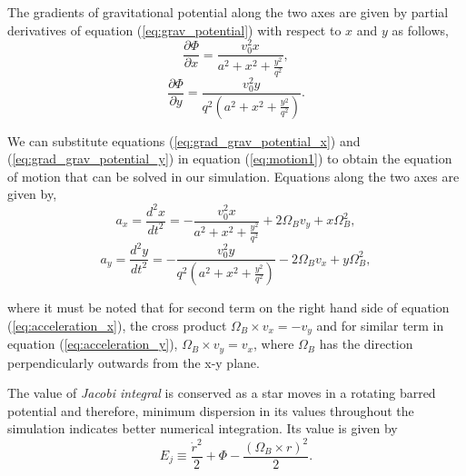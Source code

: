 \documentclass[a4paper]{article}
\begin{document}
	The gradients of gravitational potential along the two axes are given by partial derivatives of equation (\ref{eq:grav_potential}) with respect to \(x\) and \(y\) as follows,
	\begin{equation}
		\frac{\partial \Phi}{\partial x} = \frac{v_0^2 x}{a^2+x^2+\frac{y^2}{q^2}},
		\label{eq:grad_grav_potential_x}
	\end{equation}
	\begin{equation}
		\frac{\partial \Phi}{\partial y} = \frac{v_0^2 y}{q^2(a^2+x^2+\frac{y^2}{q^2})}.
		\label{eq:grad_grav_potential_y}
	\end{equation}
	
	We can substitute equations (\ref{eq:grad_grav_potential_x}) and (\ref{eq:grad_grav_potential_y}) in equation (\ref{eq:motion1}) to obtain the equation of motion that can be solved in our simulation. Equations along the two axes are given by,
	\begin{equation}
		a_x = \frac{d^2x}{dt^2} = - \frac{v_0^2 x}{a^2+x^2+\frac{y^2}{q^2}} + 2\Omega_B v_y + x \Omega_B^2 ,
		\label{eq:acceleration_x}
	\end{equation}
	\begin{equation}
		a_y = \frac{d^2y}{dt^2} = - \frac{v_0^2 y}{q^2(a^2+x^2+\frac{y^2}{q^2})} - 2\Omega_B v_x + y \Omega_B^2,
		\label{eq:acceleration_y}
	\end{equation}
	
	where it must be noted that for second term on the right hand side of equation (\ref{eq:acceleration_x}), the cross product \(\Omega_B \times v_x = -v_y\) and for similar term in equation (\ref{eq:acceleration_y}), \(\Omega_B \times v_y = v_x\), where \(\Omega_B\) has the direction perpendicularly outwards from the x-y plane.
	
	The value of \emph{Jacobi integral} is conserved as a star moves in a rotating barred potential and  therefore, minimum dispersion in its values throughout the simulation indicates better numerical integration. Its value is given by 
	\begin{equation}
		E_j \equiv \frac{\dot r^2}{2} + \Phi -\frac{(\Omega_B \times r)^2}{2}.
		\label{eq:jacobi_integral}
	\end{equation}
	
\end{document}
